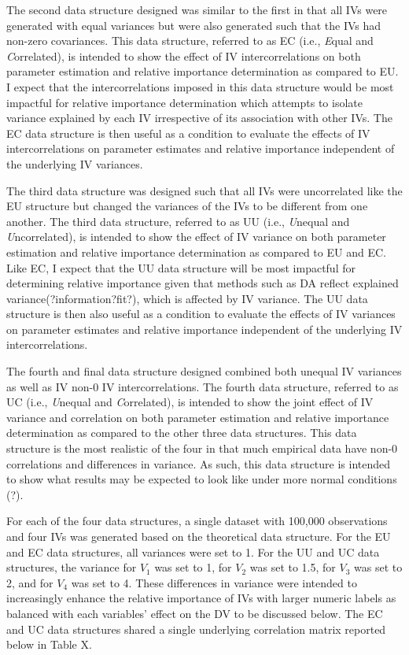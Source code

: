 \documentclass[ShortAfour,times,sageapa]{sagej}
\begin{document}
	The second data structure designed was similar to the first in that all IVs were generated with equal variances but were also generated such that the IVs had non-zero covariances. 
	This data structure, referred to as EC (i.e., \emph{E}qual and \emph{C}orrelated), is intended to show the effect of IV intercorrelations on both parameter estimation and relative importance determination as compared to EU.  
	I expect that the intercorrelations imposed in this data structure would be most impactful for relative importance determination which attempts to isolate variance explained by each IV irrespective of its association with other IVs.
	The EC data structure is then useful as a condition to evaluate the effects of IV intercorrelations on parameter estimates and relative importance independent of the underlying IV variances.
	
	The third data structure was designed such that all IVs were uncorrelated like the EU structure but changed the variances of the IVs to be different from one another.  
	The third data structure, referred to as UU (i.e., \emph{U}nequal and \emph{U}ncorrelated), is intended to show the effect of IV variance on both parameter estimation and relative importance determination as compared to EU and EC.
	Like EC, I expect that the UU data structure will be most impactful for determining relative importance given that methods such as DA reflect explained variance(?information?fit?), which is affected by IV variance. 
	The UU data structure is then also useful as a condition to evaluate the effects of IV variances on parameter estimates and relative importance independent of the underlying IV intercorrelations.
	
	The fourth and final data structure designed combined both unequal IV variances as well as IV non-0 IV intercorrelations.
	The fourth data structure, referred to as UC (i.e., \emph{U}nequal and \emph{C}orrelated), is intended to show the joint effect of IV variance and correlation on both parameter estimation and relative importance determination as compared to the other three data structures.
	This data structure is the most realistic of the four in that much empirical data have non-0 correlations and differences in variance.  
	As such, this data structure is intended to show what results may be expected to look like under more normal conditions (?).  
	
	For each of the four data structures, a single dataset with 100,000 observations and four IVs was generated based on the theoretical data structure.  
	For the EU and EC data structures, all variances were set to 1. For the UU and UC data structures, the variance for $V_{1}$ was set to 1, for $V_2$ was set to 1.5, for $V_3$ was set to 2, and for $V_4$ was set to 4. 
	These differences in variance were intended to increasingly enhance the relative importance of IVs with larger numeric labels as balanced with each variables' effect on the DV to be discussed below.  
	The EC and UC data structures shared a single underlying correlation matrix reported below in Table X.
	
\end{document}
